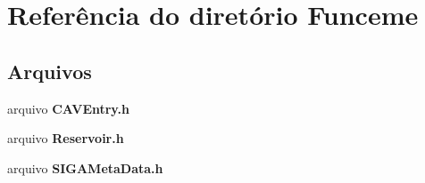 \section{Referência do diretório Funceme}
\label{dir_a0319a55188d73bd2b7cbeb51e7ab45d}
\subsection*{Arquivos}
\begin{DoxyCompactItemize}
\item 
arquivo {\bf C\+A\+V\+Entry.\+h}
\item 
arquivo {\bf Reservoir.\+h}
\item 
arquivo {\bf S\+I\+G\+A\+Meta\+Data.\+h}
\end{DoxyCompactItemize}
